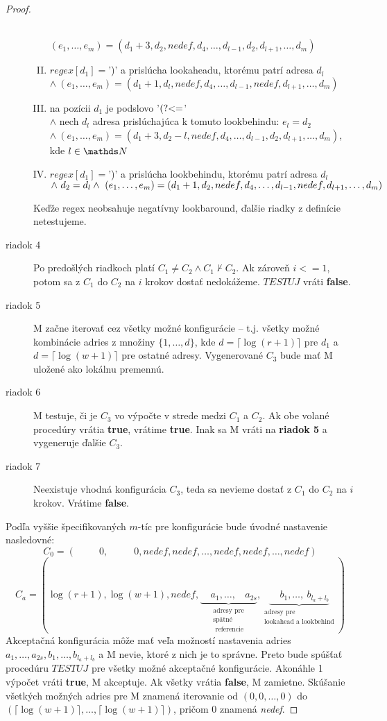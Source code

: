 \begin{proof}
\begin{description}
\begin{enumerate}[I.]
\\ $(e_1,\dots,e_m)=(d_1+3,d_2,nedef,d_4,\dots,d_{l-1},d_2,d_{l+1},\dots,d_m)$
\item $regex[d_1]=$')' a prislúcha lookaheadu, ktorému patrí adresa $d_l$ 
\\ $\wedge ~(e_1,\dots,e_m)=(d_1+1,d_l,nedef,d_4,\dots,d_{l-1},nedef,d_{l+1},\dots,d_m)$
\item na pozícii $d_1$ je podslovo '$\text{(?\textless =}$' 
\\ $\wedge$ nech $d_l$ adresa prislúchajúca k tomuto lookbehindu: $e_l=d_2$ 
\\ $\wedge ~(e_1,\dots,e_m)=(d_1+3,d_2-l,nedef,d_4,\dots,d_{l-1},d_2,d_{l+1},\dots,d_m)$, kde $l\in\N$
\item $regex[d_1]=$')' a prislúcha lookbehindu, ktorému patrí adresa $d_l$ \\ $\wedge ~ d_2=d_l \\ \wedge ~(e_1,\dots,e_m)=(d_1+1,d_2,nedef,d_4,\dots,d_{l-1},nedef,d_{l+1},\dots,d_m)$
\end{enumerate}
Keďže regex neobsahuje negatívny lookbaround, ďalšie riadky z definície netestujeme.
\item[riadok 4] Po predošlých riadkoch platí $C_1\neq C_2 \wedge C_1 \nvdash C_2$. Ak zároveň $i<=1$, potom sa z $C_1$ do $C_2$ na $i$ krokov dostať nedokážeme. $TESTUJ$ vráti \textbf{false}.
\item[riadok 5] M začne iterovať cez všetky možné konfigurácie -- t.j. všetky možné kombinácie adries z množiny $\lbrace 1,\dots,d\rbrace$, kde $d=\lceil\log(r+1)\rceil$ pre $d_1$ a $d=\lceil\log(w+1)\rceil$ pre ostatné adresy. Vygenerované $C_3$ bude mať M uložené ako lokálnu premennú.
\item[riadok 6] M testuje, či je $C_3$ vo výpočte v strede medzi $C_1$ a $C_2$. Ak obe volané procedúry vrátia \textbf{true}, vrátime \textbf{true}. Inak sa M vráti na \textbf{riadok 5} a vygeneruje ďalšie $C_3$.
\item[riadok 7] Neexistuje vhodná konfigurácia $C_3$, teda sa nevieme dostať z $C_1$ do $C_2$ na $i$ krokov. Vrátime \textbf{false}.
\end{description}

Podľa vyššie špecifikovaných $m$-tíc pre konfigurácie bude úvodné nastavenie nasledovné: 
$$C_0=(~~~~~~~~~~~0,~~~~~~~~~~~~0,nedef,nedef,\dots,nedef,nedef,\dots,nedef)$$
$$C_a=(\log(r+1),\log(w+1),nedef,\underbrace{~~~~~a_1,\dots,~~~~a_{2s}}_{\substack{\text{adresy pre}\\\text{spätné}\\\text{ referencie}}},\underbrace{~~~~~b_1,\dots,~b_{l_a+l_b}}_{\substack{\text{adresy pre}\\\text{lookahead a lookbehind}}})$$
Akceptačná konfigurácia môže mať veľa možností nastavenia adries $a_1,\dots,a_{2s},b_1,\dots,\allowbreak b_{l_a+l_b}$ a M nevie, ktoré z nich je to správne. Preto bude spúšťať procedúru $TESTUJ$ pre všetky možné akceptačné konfigurácie. Akonáhle 1 výpočet vráti \textbf{true}, M akceptuje. Ak všetky vrátia \textbf{false}, M zamietne. Skúšanie všetkých možných adries pre M znamená iterovanie od $(0,0,\dots,0)$ do $(\lceil\log( w+1)\rceil,\dots,\lceil\log( w+1)\rceil)$, pričom 0 znamená \textit{nedef}.



\end{proof}
